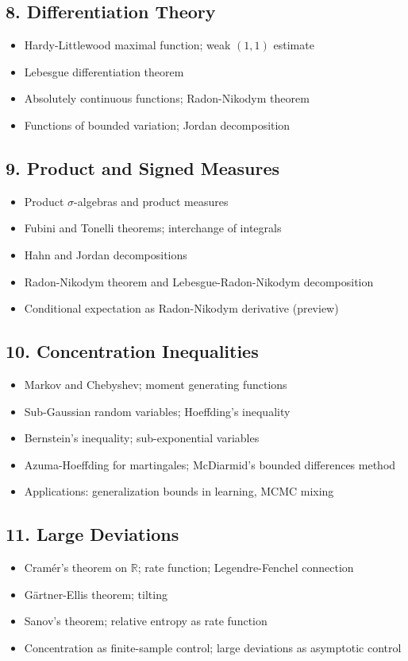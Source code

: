 \subsection{8. Differentiation Theory}
\begin{itemize}
\item Hardy-Littlewood maximal function; weak $(1,1)$ estimate
\item Lebesgue differentiation theorem
\item Absolutely continuous functions; Radon-Nikodym theorem
\item Functions of bounded variation; Jordan decomposition
\end{itemize}

\subsection{9. Product and Signed Measures}
\begin{itemize}
\item Product $\sigma$-algebras and product measures
\item Fubini and Tonelli theorems; interchange of integrals
\item Hahn and Jordan decompositions
\item Radon-Nikodym theorem and Lebesgue-Radon-Nikodym decomposition
\item Conditional expectation as Radon-Nikodym derivative (preview)
\end{itemize}

\subsection{10. Concentration Inequalities}
\begin{itemize}
\item Markov and Chebyshev; moment generating functions
\item Sub-Gaussian random variables; Hoeffding's inequality
\item Bernstein's inequality; sub-exponential variables
\item Azuma-Hoeffding for martingales; McDiarmid's bounded differences method
\item Applications: generalization bounds in learning, MCMC mixing
\end{itemize}

\subsection{11. Large Deviations}
\begin{itemize}
\item Cram\'er's theorem on $\mathbb{R}$; rate function; Legendre-Fenchel connection
\item G\"artner-Ellis theorem; tilting
\item Sanov's theorem; relative entropy as rate function
\item Concentration as finite-sample control; large deviations as asymptotic control
\end{itemize}

